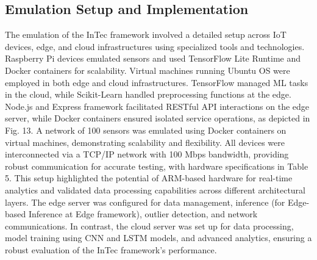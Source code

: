 \documentclass[11pt]{article}
\begin{document}
	\begin{table}[h]
		\centering
		\caption{Activity classes of MHEALTH dataset}
	\end{table}
	
	\subsection{Emulation Setup and Implementation}
	The emulation of the InTec framework involved a detailed setup across IoT devices,
	edge, and cloud infrastructures using specialized tools and technologies. Raspberry
	Pi devices emulated sensors and used TensorFlow Lite Runtime and Docker containers for scalability. Virtual machines running Ubuntu OS were employed in both
	edge and cloud infrastructures. TensorFlow managed ML tasks in the cloud, while
	Scikit-Learn handled preprocessing functions at the edge. Node.js and Express
	framework facilitated RESTful API interactions on the edge server, while Docker
	containers ensured isolated service operations, as depicted in Fig. 13. A network
	of 100 sensors was emulated using Docker containers on virtual machines, demonstrating scalability and flexibility. All devices were interconnected via a TCP/IP
	network with 100 Mbps bandwidth, providing robust communication for accurate testing, with hardware specifications in Table 5. This setup highlighted the potential
	of ARM-based hardware for real-time analytics and validated data processing capabilities across different architectural layers. The edge server was configured for data management, inference (for Edge-based Inference at Edge framework), outlier detection, and network communications. In contrast, the cloud server was set up for data
	processing, model training using CNN and LSTM models, and advanced analytics,
	ensuring a robust evaluation of the InTec framework’s performance.
	
\end{document}
